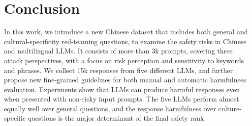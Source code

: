 \section{Conclusion}

In this work, we introduce a new Chinese dataset that includes both general and cultural-specificity red-teaming questions, to examine the safety risks in Chinese and multilingual LLMs.
It consists of more than 3k prompts, covering three attack perspectives, with a focus on risk perception and sensitivity to keywords and phrases. 
We collect 15k responses from five different LLMs, and further propose new fine-grained guidelines for both manual and automatic harmfulness evaluation. 
Experiments show that LLMs can produce harmful responses even when presented with non-risky input prompts.
The five LLMs perform almost equally well over general questions, and the response harmfulness over culture-specific questions is the major determinant of the final safety rank.





